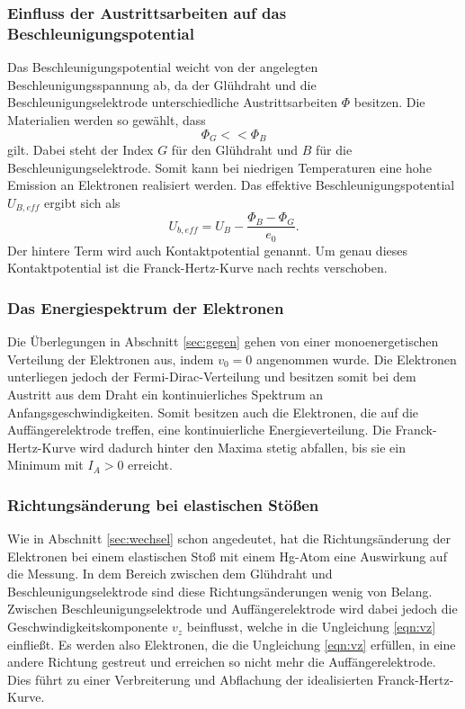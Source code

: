 \subsubsection*{Einfluss der Austrittsarbeiten auf das Beschleunigungspotential}
Das Beschleunigungspotential weicht von der angelegten Beschleunigungsspannung ab, da der Glühdraht und die Beschleunigungselektrode
unterschiedliche Austrittsarbeiten $\Phi$ besitzen. Die Materialien werden so gewählt, dass
\begin{equation*}
    \Phi_G<<\Phi_B
\end{equation*}
gilt. Dabei steht der Index $G$ für den Glühdraht und $B$ für die Beschleunigungselektrode. Somit kann bei niedrigen
Temperaturen eine hohe Emission an Elektronen realisiert werden. Das effektive Beschleunigungspotential $U_{B,eff}$ ergibt sich als
\begin{equation*}
    U_{b,eff}=U_B-\frac{\Phi_B-\Phi_G}{e_0} .
\end{equation*}
Der hintere Term wird auch Kontaktpotential genannt. Um genau dieses Kontaktpotential ist die Franck-Hertz-Kurve nach rechts verschoben.

\subsubsection*{Das Energiespektrum der Elektronen}
Die Überlegungen in Abschnitt \ref{sec:gegen} gehen von einer monoenergetischen Verteilung der Elektronen aus, indem $v_0=0$ angenommen
wurde. Die Elektronen unterliegen jedoch der Fermi-Dirac-Verteilung und besitzen somit bei dem Austritt aus dem Draht ein kontinuierliches
Spektrum an Anfangsgeschwindigkeiten. Somit besitzen auch die Elektronen, die auf die Auffängerelektrode treffen, eine kontinuierliche
Energieverteilung. Die Franck-Hertz-Kurve wird dadurch hinter den Maxima stetig abfallen, bis sie ein Minimum mit $I_A>0$ erreicht.

\subsubsection*{Richtungsänderung bei elastischen Stößen}
Wie in Abschnitt \ref{sec:wechsel} schon angedeutet, hat die Richtungsänderung der Elektronen bei einem elastischen Stoß mit einem Hg-Atom
eine Auswirkung auf die Messung. In dem Bereich zwischen dem Glühdraht und Beschleunigungselektrode sind diese Richtungsänderungen
wenig von Belang. Zwischen Beschleunigungselektrode und Auffängerelektrode wird dabei jedoch die Geschwindigkeitskomponente $v_z$ beinflusst,
welche in die Ungleichung \eqref{eqn:vz} einfließt. Es werden also Elektronen, die die Ungleichung \eqref{eqn:vz} erfüllen, in eine andere
Richtung gestreut und erreichen so nicht mehr die Auffängerelektrode. Dies führt zu einer Verbreiterung und Abflachung der idealisierten
Franck-Hertz-Kurve.

